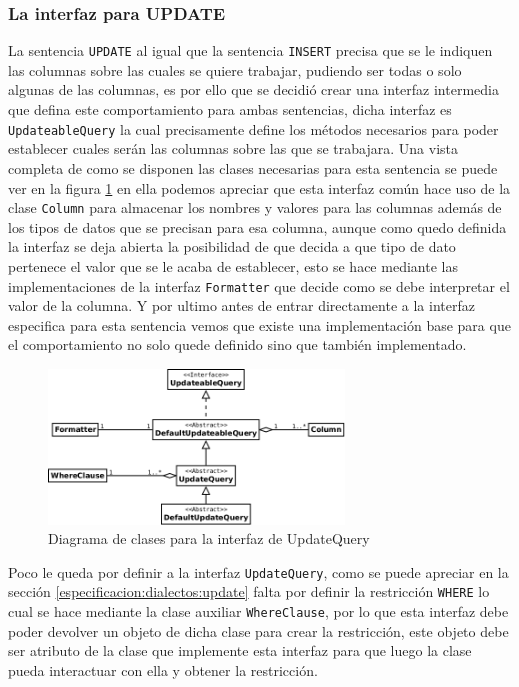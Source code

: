 \subsubsection{La interfaz para UPDATE}
La sentencia \verb=UPDATE= al igual que la sentencia \verb=INSERT= precisa que se le indiquen las columnas sobre las cuales se quiere trabajar, pudiendo ser todas o solo algunas de las columnas, es por ello que se decidió crear una interfaz intermedia que defina este comportamiento para ambas sentencias, dicha interfaz es \verb=UpdateableQuery= la cual precisamente define los métodos necesarios para poder establecer cuales serán las columnas sobre las que se trabajara. Una vista completa de como se disponen las clases necesarias para esta sentencia se puede ver en la figura \ref{fig:dc-updatequery} en ella podemos apreciar que esta interfaz común hace uso de la clase \verb=Column= para almacenar los nombres y valores para las columnas además de los tipos de datos que se precisan para esa columna, aunque como quedo definida la interfaz se deja abierta la posibilidad de que \jj decida a que tipo de dato pertenece el valor que se le acaba de establecer, esto se hace mediante las implementaciones de la interfaz \verb=Formatter= que decide como se debe interpretar el valor de la columna. Y por ultimo antes de entrar directamente a la interfaz especifica para esta sentencia vemos que existe una implementación base para que el comportamiento no solo quede definido sino que también implementado. 
%
\begin{figure}
  \centering
    \includegraphics[width=0.7\textwidth]{figuras/jdbgm-dc-update.png}
  \caption{Diagrama de clases para la interfaz de UpdateQuery}
  \label{fig:dc-updatequery}
\end{figure}

Poco le queda por definir a la interfaz \verb=UpdateQuery=, como se puede apreciar en la sección \ref{especificacion:dialectos:update} falta por definir la restricción \verb=WHERE= lo cual se hace mediante la clase auxiliar \verb=WhereClause=, por lo que esta interfaz debe poder devolver un objeto de dicha clase para crear la restricción, este objeto debe ser atributo de la clase que implemente esta interfaz para que luego la clase pueda interactuar con ella y obtener la restricción. 
%
